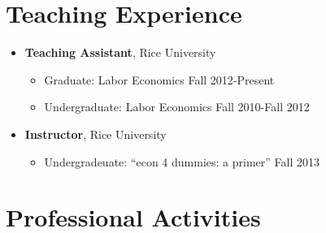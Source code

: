 \documentclass{article}[12]
\begin{document}
\section{Teaching Experience}

\begin{itemize}[itemsep=0.5em]
    
    \item \textbf{Teaching Assistant}, Rice University 
    \begin{itemize}
        \item Graduate: Labor Economics \hfill Fall 2012-Present 
        \item Undergraduate: Labor Economics \hfill Fall 2010-Fall 2012
    \end{itemize}
    
    \item \textbf{Instructor}, Rice University
    \begin{itemize}
        \item Undergradeuate: ``econ 4 dummies: a primer''  \hfill Fall 2013
    \end{itemize}

\end{itemize}


\section{Professional Activities}
\end{document}
